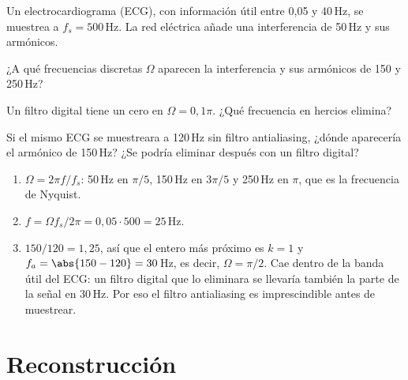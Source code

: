 \documentclass[11pt,a4paper]{scrartcl}
\begin{document}
\begin{ejercicio}
  Un electrocardiograma (ECG), con información útil entre 0,05 y 40\,Hz, se muestrea a $f_s=500$\,Hz. La red eléctrica añade una interferencia de 50\,Hz y sus armónicos.
  \begin{incisos}[1]
    \item ¿A qué frecuencias discretas $\Omega$ aparecen la interferencia y sus armónicos de 150 y 250\,Hz?
    \item Un filtro digital tiene un cero en $\Omega=0{,}1\pi$. ¿Qué frecuencia en hercios elimina?
    \item Si el mismo ECG se muestreara a 120\,Hz sin filtro antialiasing, ¿dónde aparecería el armónico de 150\,Hz? ¿Se podría eliminar después con un filtro digital?
  \end{incisos}
\end{ejercicio}
\begin{solucion}
  \begin{enumerate}[label=\alph*)]
    \item $\Omega=2\pi f/f_s$: 50\,Hz en $\pi/5$, 150\,Hz en $3\pi/5$ y 250\,Hz en $\pi$, que es la frecuencia de Nyquist.
    \item $f=\Omega f_s/2\pi=0{,}05\cdot500=25$\,Hz.
    \item $150/120=1{,}25$, así que el entero más próximo es $k=1$ y $f_a=\abs{150-120}=30$\,Hz, es decir, $\Omega=\pi/2$. Cae dentro de la banda útil del ECG: un filtro digital que lo eliminara se llevaría también la parte de la señal en 30\,Hz. Por eso el filtro antialiasing es imprescindible antes de muestrear.
  \end{enumerate}
\end{solucion}

\section*{Reconstrucción}
\end{document}
